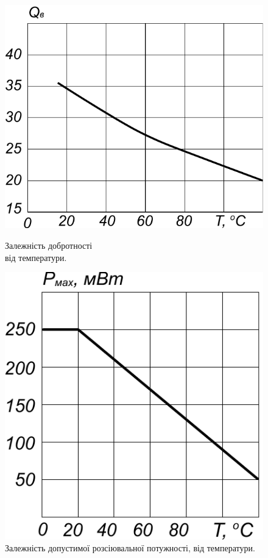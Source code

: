 \documentclass[a4paper,14pt]{extreport}
\begin{document}
\begin{figure}[h!]\label{im7}
  \begin{minipage}[h]{0.5\linewidth}
    \includegraphics[width=1\linewidth]{1.4.8.pdf}
    \caption{Залежність добротності\\ від температури.}
  \end{minipage}
\hfill
  \begin{minipage}[h]{0.5\linewidth}
    \includegraphics[width=1\linewidth]{1.4.9.pdf}
    \caption{Залежність допустимої розсіювальної потужності, від температури.}
  \end{minipage}
\end{figure}
\end{document}
